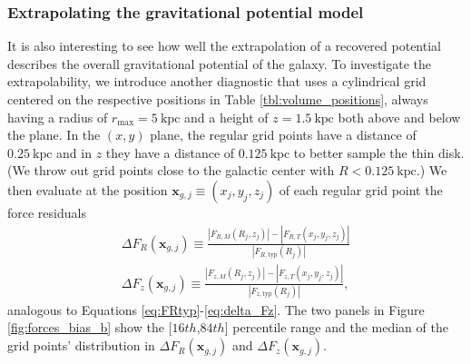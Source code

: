 \documentclass[iop,revtex4,numberedappendix,appendixfloats]{emulateapj}
\newcommand{\vect}[1]{\boldsymbol{#1}}
\begin{document}
\subsubsection{Extrapolating the gravitational potential model}

It is also interesting to see how well the extrapolation of a recovered potential describes the overall gravitational potential of the galaxy. To investigate the extrapolability, we introduce another diagnostic that uses a cylindrical grid centered on the respective positions in Table \ref{tbl:volume_positions}, always having a radius of $r_\text{max}=5~\text{kpc}$ and a height of $z=1.5~\text{kpc}$ both above and below the plane. In the $(x,y)$ plane, the regular grid points have a distance of $0.25~\text{kpc}$ and in $z$ they have a distance of $0.125~\text{kpc}$ to better sample the thin disk. (We throw out grid points close to the galactic center with $R<0.125~\text{kpc}$.) We then evaluate at the position $\vect{x}_{g,j} \equiv (x_j,y_j,z_j)$ of each regular grid point the force residuals
\begin{eqnarray}
\Delta F_R(\vect{x}_{g,j}) \equiv \frac{|F_{R,M}(R_j,z_j)| - |F_{R,T}(x_j,y_j,z_j)|}{|F_{R,\text{typ}}(R_j)|} \label{eq:delta_FR_grid}\\
\Delta F_z(\vect{x}_{g,j}) \equiv \frac{|F_{z,M}(R_j,z_j)| - |F_{z,T}(x_j,y_j,z_j)|}{|F_{z,\text{typ}}(R_j)|},\label{eq:delta_Fz_grid}
\end{eqnarray}
analogous to Equations \eqref{eq:FRtyp}-\eqref{eq:delta_Fz}. The two panels in Figure \ref{fig:forces_bias_b} show the [$16th$,$84th$] percentile range and the median of the grid points' distribution in $\Delta F_R(\vect{x}_{g,j})$ and $\Delta F_z(\vect{x}_{g,j})$.
\end{document}
